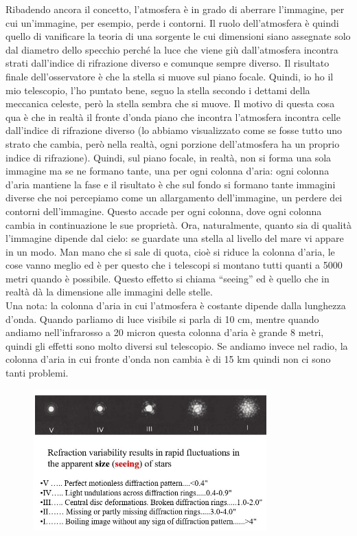 \documentclass[a4paper,11pt]{article}
\begin{document}
Ribadendo ancora il concetto, l’atmosfera è in grado di aberrare l’immagine, per cui un’immagine, per esempio, perde i contorni. Il ruolo dell’atmosfera è quindi quello di vanificare la teoria di una sorgente le cui dimensioni siano assegnate solo dal diametro dello specchio perché la luce che viene giù dall’atmosfera incontra strati dall’indice di rifrazione diverso e comunque sempre diverso. Il risultato finale dell’osservatore è che la stella si muove sul piano focale. Quindi, io ho il mio telescopio, l’ho puntato bene, seguo la stella secondo i dettami della meccanica celeste, però la stella sembra che si muove. Il motivo di questa cosa qua è che in realtà il fronte d’onda piano che incontra l’atmosfera incontra celle dall’indice di rifrazione diverso (lo abbiamo visualizzato come se fosse tutto uno strato che cambia, però nella realtà, ogni porzione dell’atmosfera ha un proprio indice di rifrazione). Quindi, sul piano focale, in realtà, non si forma una sola immagine ma se ne formano tante, una per ogni colonna d’aria: ogni colonna d’aria mantiene la fase e il risultato è che sul fondo si formano tante immagini diverse che noi percepiamo come un allargamento dell’immagine, un perdere dei contorni dell’immagine. Questo accade per ogni colonna, dove ogni colonna cambia in continuazione le sue proprietà. Ora, naturalmente, quanto sia di qualità l’immagine dipende dal cielo: se guardate una stella al livello del mare vi appare in un modo. Man mano che si sale di quota, cioè si riduce la colonna d’aria, le cose vanno meglio ed è per questo che i telescopi si montano tutti quanti a 5000 metri quando è possibile. Questo effetto si chiama “seeing” ed è quello che in realtà dà la dimensione alle immagini delle stelle.\\
Una nota: la colonna d’aria in cui l’atmosfera è costante dipende dalla lunghezza d’onda. Quando parliamo di luce visibile si parla di 10 cm, mentre quando andiamo nell’infrarosso a 20 micron questa colonna d’aria è grande 8 metri, quindi gli effetti sono molto diversi sul telescopio. Se andiamo invece nel radio, la colonna d’aria in cui fronte d’onda non cambia è di 15 km quindi non ci sono tanti problemi.

\begin{figure}[h!!]
        \centering
        \includegraphics[width=9cm]{20.jpg}
        \label{}
    \end{figure}
\end{document}
